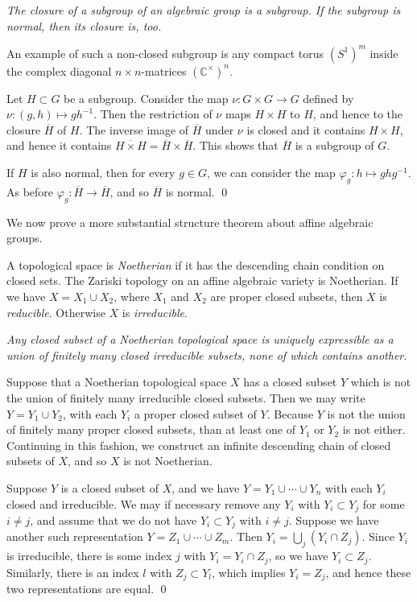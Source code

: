 \documentclass[12pt]{amsart}
\begin{document}
{\it The closure of a subgroup of an algebraic group is a subgroup.
If the subgroup is normal, then its closure is, too.}\medskip

An example of such a non-closed subgroup is any compact torus 
$(S^1)^m$ inside the complex diagonal $n\times n$-matrices 
$({\mathbb C}^\times)^n$.

Let $H\subset G$ be a subgroup.
Consider the map $\nu\colon G\times G\to G$ defined by 
$\nu\colon (g,h)\mapsto gh^{-1}$.
Then the restriction of $\nu$ maps $H\times H$ to $H$,
and hence to the closure $\overline{H}$ of $H$.
The inverse image of $\overline{H}$ under $\nu$ is closed and it contains
$H\times H$, and hence it contains 
$\overline{H\times H}=\overline{H}\times \overline{H}$.
This shows that $\overline{H}$
is a subgroup of $G$.

If $H$ is also normal, then for every $g\in G$, we can consider the map 
$\varphi_g\colon h\mapsto ghg^{-1}$.
As before $\varphi_g\colon\overline{H}\to\overline{H}$, and so
$\overline{H}$ is normal.
\qed

We now prove a more substantial structure theorem about affine algebraic
groups.

A topological space is {\sl Noetherian} if it has the descending chain
condition on closed sets.
The Zariski topology on an affine algebraic variety is Noetherian.
If we have $X=X_1\cup X_2$, where $X_1$ and $X_2$ are proper closed subsets,
then $X$ is {\sl reducible}.
Otherwise $X$ is {\it irreducible}.
\medskip


{\it Any closed subset of a Noetherian topological space is uniquely
expressible as a union of finitely many closed irreducible subsets, none of
which contains another.}\medskip

Suppose that a Noetherian topological space $X$ has a closed subset $Y$
which is not the union of finitely many irreducible closed subsets.
Then we may write $Y=Y_1\cup Y_2$, with each $Y_i$ a proper closed subset
of $Y$.
Because $Y$ is not the union of finitely many proper closed subsets, than at
least one of $Y_1$ or $Y_2$ is not either.
Continuing in this fashion, we construct an infinite descending chain of
closed subsets of $X$, and so $X$ is not Noetherian.

Suppose $Y$ is a closed subset of $X$, and we have 
$Y=Y_1\cup \cdots \cup Y_n$ with each $Y_i$ closed and irreducible.
We may if necessary remove any $Y_i$ with $Y_i\subset Y_j$ for some 
$i\neq j$, and assume that we do not have $Y_i\subset Y_j$ with $i\neq j$.
Suppose we have another such representation 
$Y=Z_1\cup\cdots\cup Z_m$.
Then $Y_i=\bigcup_j (Y_i\cap Z_j)$.
Since $Y_i$ is irreducible, there is some index $j$ with $Y_i=Y_i\cap Z_j$,
so we have $Y_i\subset Z_j$.
Similarly, there is an index $l$ with $Z_j\subset Y_l$, which implies 
$Y_i=Z_j$, and hence these two representations are equal.
\qed\bigskip
\end{document}
